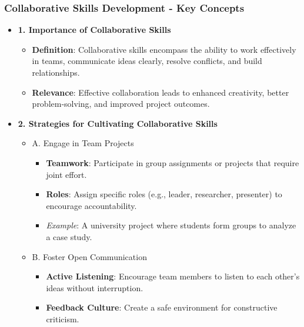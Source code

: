 \documentclass[aspectratio=169]{beamer}
\begin{document}
\begin{frame}[fragile]
    \frametitle{Collaborative Skills Development - Key Concepts}
    \begin{itemize}
        \item \textbf{1. Importance of Collaborative Skills}
        \begin{itemize}
            \item \textbf{Definition}: Collaborative skills encompass the ability to work effectively in teams, communicate ideas clearly, resolve conflicts, and build relationships.
            \item \textbf{Relevance}: Effective collaboration leads to enhanced creativity, better problem-solving, and improved project outcomes.
        \end{itemize}
        
        \item \textbf{2. Strategies for Cultivating Collaborative Skills}
        \begin{itemize}
            \item A. Engage in Team Projects
                \begin{itemize}
                    \item \textbf{Teamwork}: Participate in group assignments or projects that require joint effort.
                    \item \textbf{Roles}: Assign specific roles (e.g., leader, researcher, presenter) to encourage accountability.
                    \item \textit{Example}: A university project where students form groups to analyze a case study.
                \end{itemize}
            
            \item B. Foster Open Communication 
                \begin{itemize}
                    \item \textbf{Active Listening}: Encourage team members to listen to each other’s ideas without interruption.
                    \item \textbf{Feedback Culture}: Create a safe environment for constructive criticism.
                \end{itemize}
        \end{itemize}
    \end{itemize}
\end{frame}
\end{document}
